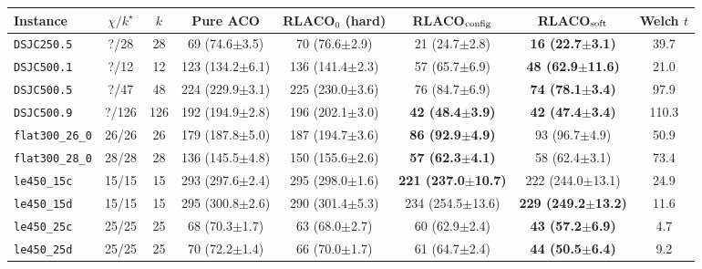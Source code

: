 \begin{tabular}{@{}lccccccc@{}}
\toprule
Instance & $\chi/k^\star$ & $k$ & Pure ACO & RLACO$_0$ (hard) & RLACO$_{\rm config}$ & RLACO$_{\rm soft}$ & Welch $t$\\
\midrule
\texttt{DSJC250.5} & ?/28 & 28 & 69 (74.6$\pm$3.5) & 70 (76.6$\pm$2.9) & 21 (24.7$\pm$2.8) & \textbf{16 (22.7$\pm$3.1)} & 39.7 \\
\texttt{DSJC500.1} & ?/12 & 12 & 123 (134.2$\pm$6.1) & 136 (141.4$\pm$2.3) & 57 (65.7$\pm$6.9) & \textbf{48 (62.9$\pm$11.6)} & 21.0 \\
\texttt{DSJC500.5} & ?/47 & 48 & 224 (229.9$\pm$3.1) & 225 (230.0$\pm$3.6) & 76 (84.7$\pm$6.9) & \textbf{74 (78.1$\pm$3.4)} & 97.9 \\
\texttt{DSJC500.9} & ?/126 & 126 & 192 (194.9$\pm$2.8) & 196 (202.1$\pm$3.0) & \textbf{42 (48.4$\pm$3.9)} & \textbf{42 (47.4$\pm$3.4)} & 110.3 \\
\texttt{flat300\_26\_0} & 26/26 & 26 & 179 (187.8$\pm$5.0) & 187 (194.7$\pm$3.6) & \textbf{86 (92.9$\pm$4.9)} & 93 (96.7$\pm$4.9) & 50.9 \\
\texttt{flat300\_28\_0} & 28/28 & 28 & 136 (145.5$\pm$4.8) & 150 (155.6$\pm$2.6) & \textbf{57 (62.3$\pm$4.1)} & 58 (62.4$\pm$3.1) & 73.4 \\
\texttt{le450\_15c} & 15/15 & 15 & 293 (297.6$\pm$2.4) & 295 (298.0$\pm$1.6) & \textbf{221 (237.0$\pm$10.7)} & 222 (244.0$\pm$13.1) & 24.9 \\
\texttt{le450\_15d} & 15/15 & 15 & 295 (300.8$\pm$2.6) & 290 (301.4$\pm$5.3) & 234 (254.5$\pm$13.6) & \textbf{229 (249.2$\pm$13.2)} & 11.6 \\
\texttt{le450\_25c} & 25/25 & 25 & 68 (70.3$\pm$1.7) & 63 (68.0$\pm$2.7) & 60 (62.9$\pm$2.4) & \textbf{43 (57.2$\pm$6.9)} & 4.7 \\
\texttt{le450\_25d} & 25/25 & 25 & 70 (72.2$\pm$1.4) & 66 (70.0$\pm$1.7) & 61 (64.7$\pm$2.4) & \textbf{44 (50.5$\pm$6.4)} & 9.2 \\
\bottomrule
\end{tabular}
